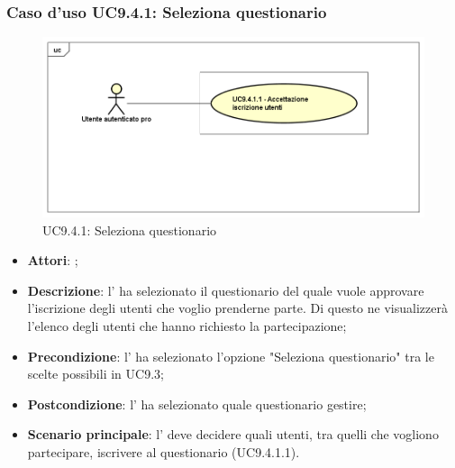 		 \subsubsection{Caso d'uso UC9.4.1: Seleziona questionario}
		 \label{UC9.4.1}
		 \begin{figure}[h]
		 	\centering
		 	\includegraphics[scale=0.5,keepaspectratio]{UML/UC9_4_1.png}
		 	\caption{UC9.4.1: Seleziona questionario}
		 \end{figure}
		 \FloatBarrier
		 \begin{itemize}
		 	\item \textbf{Attori}: \uaupro{};
		 	\item \textbf{Descrizione}: l'\uaupro{} ha selezionato il questionario del quale vuole approvare l'iscrizione degli utenti che voglio prenderne parte. Di questo ne visualizzerà l'elenco degli utenti che hanno richiesto la partecipazione; 
		 	\item \textbf{Precondizione}: l'\uaupro{} ha selezionato l'opzione "Seleziona questionario" tra le scelte possibili in UC9.3;
		 	\item \textbf{Postcondizione}: l'\uaupro{} ha selezionato quale questionario gestire;
		 	\item \textbf{Scenario principale}: l'\uaupro{} deve decidere quali utenti, tra quelli che vogliono partecipare, iscrivere al questionario (UC9.4.1.1).
		 \end{itemize}
		 
